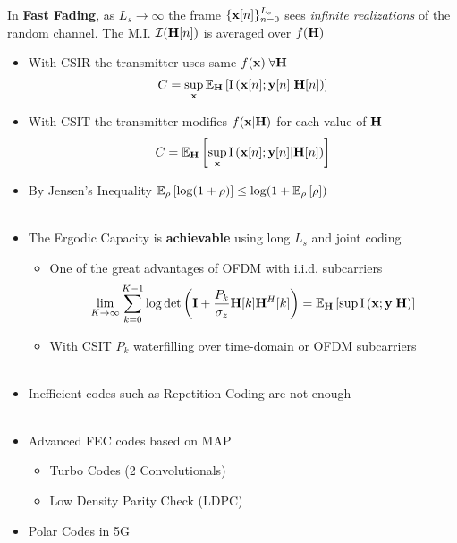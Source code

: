 \documentclass[xcolor=dvipsnames,aspectratio=169]{beamer}
\begin{document}
{\begin{definition}
In \textbf{Fast Fading}, as $L_{s}\to\infty$ the frame $\{\mathbf{x}[n]\}_{n=0}^{L_{s}}$ sees \textit{infinite realizations} of the random channel. The M.I. $\mathcal{I}(\mathbf{H}[n])$ is averaged over $f(\mathbf{H})$
\begin{itemize}
     \item With CSIR the transmitter uses same $f(\mathbf{x})\; \forall \mathbf{H}$
        $$C=\sup_{\mathbf{x}}{\mathbb{E}_{\mathbf{H}}\left[ {\textnormal{I}\left(\mathbf{x}[n];\mathbf{y}[n]|\mathbf{H}[n]\right)}\right]}$$
     \item With CSIT the transmitter modifies $f(\mathbf{x}|\mathbf{H})$ for each value of $\mathbf{H}$
        $$C={\mathbb{E}_{\mathbf{H}}\left[ \sup_{\mathbf{x}} {\textnormal{I}\left(\mathbf{x}[n];\mathbf{y}[n]|\mathbf{H}[n]\right)}\right]}$$
    \end{itemize}
\end{definition}
\begin{itemize}
 \item By Jensen's Inequality ${\mathbb{E}_{\rho}\left[\log(1+\rho)\right]}\leq\log(1+{\mathbb{E}_{\rho}\left[\rho\right]})$\\ \ \\
 \item The Ergodic Capacity is \textbf{achievable} using long $L_{s}$ and joint coding
 \begin{itemize}
    \item One of the great advantages of OFDM with i.i.d. subcarriers
        $$\lim_{K\to\infty} \sum_{k=0}^{K-1}\log\det\left(\mathbf{I}+\frac{P_k}{\sigma_z}\mathbf{H}[k]\mathbf{H}^H[k]\right)={\mathbb{E}_{\mathbf{H}}\left[\sup {\textnormal{I}\left(\mathbf{x};\mathbf{y}|\mathbf{H}\right)}\right]}$$
    \item With CSIT $P_k$ waterfilling over time-domain or OFDM subcarriers\\ \ \\
 \end{itemize}
 \item Inefficient codes such as Repetition Coding are not enough\\ \ \\
 \item Advanced FEC codes based on MAP
 \begin{itemize}
    \item Turbo Codes (2 Convolutionals)
    \item Low Density Parity Check (LDPC)
 \end{itemize}
 \item Polar Codes in 5G
\end{itemize}
\pagebreak

}
\end{document}
